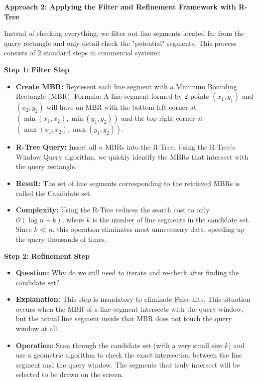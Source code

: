 \documentclass[a4paper, 10pt, titlepage]{report}
\begin{document}
\textbf{Approach 2: Applying the Filter and Refinement Framework with R-Tree}

Instead of checking everything, we filter out line segments located far from the query rectangle and only detail-check the "potential" segments. This process consists of 2 standard steps in commercial systems:

\textbf{Step 1: Filter Step}
\begin{itemize}
    \item \textbf{Create MBR:} Represent each line segment with a Minimum Bounding Rectangle (MBR). Formula: A line segment formed by 2 points $(x_1, y_1)$ and $(x_2, y_2)$ will have an MBR with the bottom-left corner at $(\min(x_1, x_2), \min(y_1, y_2))$ and the top-right corner at $(\max(x_1, x_2), \max(y_1, y_2))$.
    \item \textbf{R-Tree Query:} Insert all $n$ MBRs into the R-Tree. Using the R-Tree's Window Query algorithm, we quickly identify the MBRs that intersect with the query rectangle.
    \item \textbf{Result:} The set of line segments corresponding to the retrieved MBRs is called the Candidate set.
    \item \textbf{Complexity:} Using the R-Tree reduces the search cost to only $\mathcal{O}(\log n + k)$, where $k$ is the number of line segments in the candidate set. Since $k \ll n$, this operation eliminates most unnecessary data, speeding up the query thousands of times.
\end{itemize}

\textbf{Step 2: Refinement Step}
\begin{itemize}
    \item \textbf{Question:} Why do we still need to iterate and re-check after finding the candidate set?
    \item \textbf{Explanation:} This step is mandatory to eliminate False hits. This situation occurs when the MBR of a line segment intersects with the query window, but the actual line segment inside that MBR does not touch the query window at all.
    \item \textbf{Operation:} Scan through the candidate set (with a very small size $k$) and use a geometric algorithm to check the exact intersection between the line segment and the query window. The segments that truly intersect will be selected to be drawn on the screen.
\end{itemize}

\vspace{0.5cm}
\end{document}
